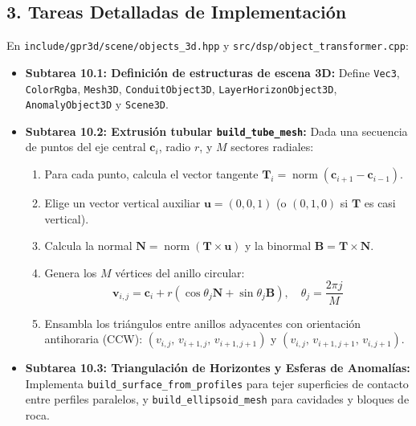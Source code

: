 \documentclass[11pt,a4paper]{article}
\begin{document}
\subsection{3. Tareas Detalladas de Implementación}
En \texttt{include/gpr3d/scene/objects\_3d.hpp} y \texttt{src/dsp/object\_transformer.cpp}:
\begin{itemize}
    \item \textbf{Subtarea 10.1: Definición de estructuras de escena 3D:}
    Define \texttt{Vec3}, \texttt{ColorRgba}, \texttt{Mesh3D}, \texttt{ConduitObject3D}, \texttt{LayerHorizonObject3D}, \texttt{AnomalyObject3D} y \texttt{Scene3D}.

    \item \textbf{Subtarea 10.2: Extrusión tubular \texttt{build\_tube\_mesh}:}
    Dada una secuencia de puntos del eje central $\mathbf{c}_i$, radio $r$, y $M$ sectores radiales:
    \begin{enumerate}
        \item Para cada punto, calcula el vector tangente $\mathbf{T}_i = \operatorname{norm}(\mathbf{c}_{i+1} - \mathbf{c}_{i-1})$.
        \item Elige un vector vertical auxiliar $\mathbf{u} = (0,0,1)$ (o $(0,1,0)$ si $\mathbf{T}$ es casi vertical).
        \item Calcula la normal $\mathbf{N} = \operatorname{norm}(\mathbf{T} \times \mathbf{u})$ y la binormal $\mathbf{B} = \mathbf{T} \times \mathbf{N}$.
        \item Genera los $M$ vértices del anillo circular:
        \begin{equation}
            \mathbf{v}_{i,j} = \mathbf{c}_i + r\left(\cos\theta_j \mathbf{N} + \sin\theta_j \mathbf{B}\right), \quad \theta_j = \frac{2\pi j}{M}
        \end{equation}
        \item Ensambla los triángulos entre anillos adyacentes con orientación antihoraria (CCW):
        $(v_{i,j}, \, v_{i+1,j}, \, v_{i+1,j+1})$ y $(v_{i,j}, \, v_{i+1,j+1}, \, v_{i,j+1})$.
    \end{enumerate}

    \item \textbf{Subtarea 10.3: Triangulación de Horizontes y Esferas de Anomalías:}
    Implementa \texttt{build\_surface\_from\_profiles} para tejer superficies de contacto entre perfiles paralelos, y \texttt{build\_ellipsoid\_mesh} para cavidades y bloques de roca.
\end{itemize}
\end{document}
